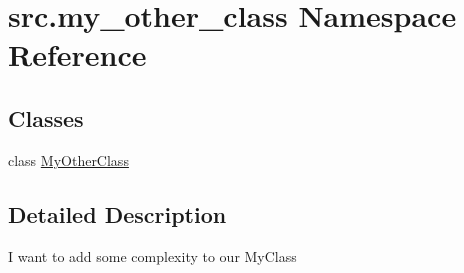 \hypertarget{namespacesrc_1_1my__other__class}{}\section{src.\+my\+\_\+other\+\_\+class Namespace Reference}
\label{namespacesrc_1_1my__other__class}
\subsection*{Classes}
\begin{DoxyCompactItemize}
\item 
class \hyperlink{classsrc_1_1my__other__class_1_1MyOtherClass}{My\+Other\+Class}
\end{DoxyCompactItemize}


\subsection{Detailed Description}
\begin{DoxyVerb}I want to add some complexity to our MyClass
\end{DoxyVerb}
 